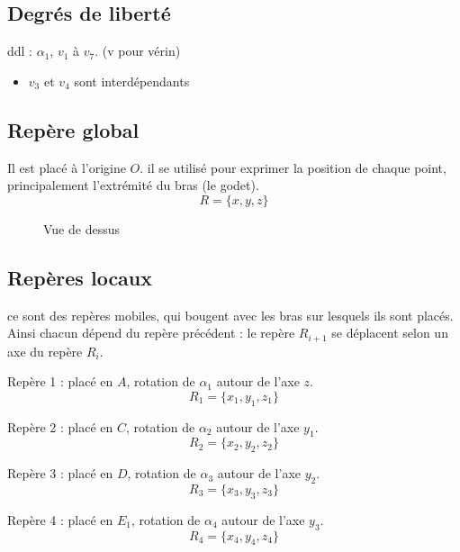 \documentclass[12pt,a4paper,twoside]{article}
\begin{document}
\subsection{Degrés de liberté}
ddl : $\alpha_1$, $v_1$ à $v_7$. (v pour vérin)\\
\begin{itemize}
	\item $v_3$ et $v_4$ sont interdépendants
\end{itemize}

\subsection{Repère global}

Il est placé à l'origine $O$. il se utilisé pour exprimer la position de chaque point, principalement l'extrémité du bras (le godet).
\begin{equation}
R=\{x,y,z\}
\end{equation}
\medbreak
\medbreak

\begin{figure}[H]
	\centering
	\caption{Vue de dessus}
\end{figure}

\subsection{Repères locaux}
ce sont des repères mobiles, qui bougent avec les bras sur lesquels ils sont placés. Ainsi chacun dépend du repère précédent : le repère $R_{i+1}$ se déplacent selon un axe du repère $R_i$.
\medbreak

Repère 1 : placé en $A$, rotation de $\alpha_1$ autour de l'axe $z$.
\begin{equation}
R_1=\{x_1,y_1,z_1\}
\end{equation}

\medbreak
Repère 2 : placé en $C$, rotation de $\alpha_2$ autour de l'axe $y_1$.
\begin{equation}
R_2=\{x_2,y_2,z_2\}
\end{equation}


\medbreak
Repère 3 : placé en $D$, rotation de $\alpha_3$ autour de l'axe $y_2$.
\begin{equation}
R_3=\{x_3,y_3,z_3\}
\end{equation}

\medbreak
Repère 4 : placé en $E_1$, rotation de $\alpha_4$ autour de l'axe $y_3$.
\begin{equation}
R_4=\{x_4,y_4,z_4\}
\end{equation}
\end{document}
